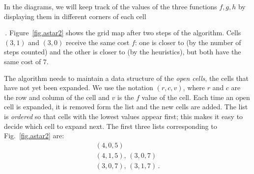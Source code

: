 \begin{figure}
\subfigures
\begin{minipage}{\textwidth}
\hspace{\fill}
\end{minipage}
\end{figure}

In the diagrams, we will keep track of the values of the three functions $f,g,h$ by displaying them in different corners of each cell
\,.
Figure~\ref{fig.astar2} shows the grid map after two steps of the \astar{} algorithm. Cells $(3,1)$ and $(3,0)$ receive the same cost $f$: one is closer to  (by the number of steps counted) and the other is closer to  (by the heuristics), but both have the same cost of $7$.

The algorithm needs to maintain a data structure of the \emph{open cells}, the cells that have not yet been expanded. We use the notation $(r,c,v)$, where $r$ and $c$ are the row and column of the cell and $v$ is the $f$ value of the cell. Each time an open cell is expanded, it is removed form the list and the new cells are added. The list is \emph{ordered} so that cells with the lowest values appear first; this makes it easy to decide which cell to expand next. The first three lists corresponding to Fig.~\ref{fig.astar2} are:
\begin{displaymath}
\begin{array}{l}
(4,0,5)\\
(4,1,5),\,(3,0,7)\\
(3,0,7),\,(3,1,7)\,.
\end{array}
\end{displaymath}

